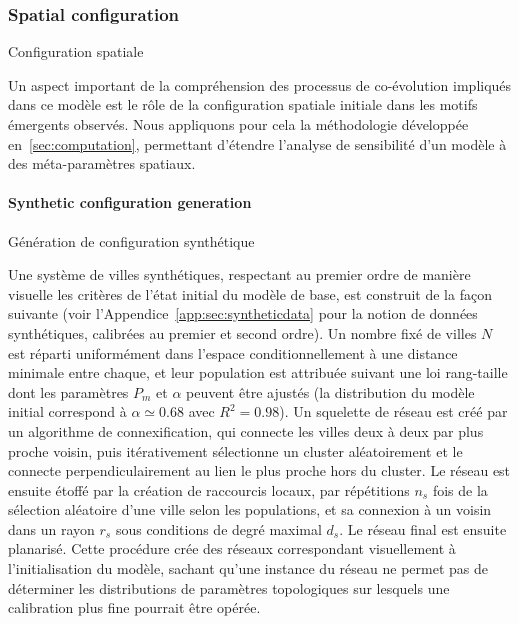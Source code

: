 \subsubsection{Spatial configuration}{Configuration spatiale}

Un aspect important de la compréhension des processus de co-évolution impliqués dans ce modèle est le rôle de la configuration spatiale initiale dans les motifs émergents observés. Nous appliquons pour cela la méthodologie développée en~\ref{sec:computation}, permettant d'étendre l'analyse de sensibilité d'un modèle à des méta-paramètres spatiaux.

\paragraph{Synthetic configuration generation}{Génération de configuration synthétique}

Une système de villes synthétiques, respectant au premier ordre de manière visuelle les critères de l'état initial du modèle de base, est construit de la façon suivante (voir l'Appendice~\ref{app:sec:syntheticdata} pour la notion de données synthétiques, calibrées au premier et second ordre). Un nombre fixé de villes $N$ est réparti uniformément dans l'espace conditionnellement à une distance minimale entre chaque, et leur population est attribuée suivant une loi rang-taille dont les paramètres $P_{m}$ et $\alpha$ peuvent être ajustés (la distribution du modèle initial correspond à $\alpha\simeq 0.68$ avec $R^2=0.98$). Un squelette de réseau est créé par un algorithme de connexification, qui connecte les villes deux à deux par plus proche voisin, puis itérativement sélectionne un cluster aléatoirement et le connecte perpendiculairement au lien le plus proche hors du cluster. Le réseau est ensuite étoffé par la création de raccourcis locaux, par répétitions $n_s$ fois de la sélection aléatoire d'une ville selon les populations, et sa connexion à un voisin dans un rayon $r_s$ sous conditions de degré maximal $d_s$. Le réseau final est ensuite planarisé. Cette procédure crée des réseaux correspondant visuellement à l'initialisation du modèle, sachant qu'une instance du réseau ne permet pas de déterminer les distributions de paramètres topologiques sur lesquels une calibration plus fine pourrait être opérée.



